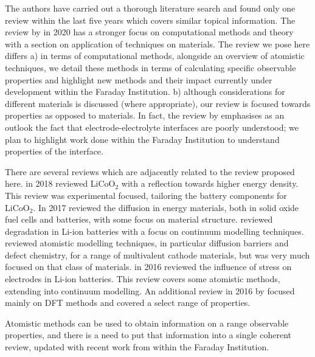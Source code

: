 \documentclass{article}
\begin{document}
The authors have carried out a thorough literature search and found only one review within the last five years which covers similar topical information. The review by \textcite{van_der_ven_rechargeable_2020} in 2020 has a stronger focus on computational methods and theory with a section on application of techniques on materials. The review we pose here differs a) in terms of computational methods, alongside an overview of atomistic techniques, we detail these methods in terms of calculating specific observable properties and highlight new methods and their impact currently under development within the Faraday Institution. b) although considerations for different materials is discussed (where appropriate), our review is focused towards properties as opposed to materials. In fact, the review by \textcite{van_der_ven_rechargeable_2020} emphasises as an outlook the fact that electrode-electrolyte interfaces are poorly understood; we plan to highlight work done within the Faraday Institution to understand properties of the interface.

There are several reviews which are adjacently related to the review proposed here. \textcite{wang_reviving_2018} in 2018 reviewed LiCoO$_2$ with a reflection towards higher energy density. This review was experimental focused, tailoring the battery components for LiCoO$_2$. In 2017 \textcite{parfitt_diffusion_2017} reviewed the diffusion in energy materials, both in solid oxide fuel cells and batteries, with some focus on material structure. \textcite{zhang_chemomechanical_2017} reviewed degradation in Li-ion batteries with a focus on continuum modelling techniques. \textcite{canepa_computational_2017} reviewed atomistic modelling techniques, in particular diffusion barriers and defect chemistry, for a range of multivalent cathode materials, but was very much focused on that class of materials. \textcite{xu_electrochemomechanics_2016} in 2016 reviewed the influence of stress on electrodes in Li-ion batteries. This review covers some atomistic methods, extending into continuum modelling. An additional review in 2016 by \textcite{urban_computational_2016} focused mainly on DFT methods and covered a select range of properties.

Atomistic methods can be used to obtain information on a range observable properties, and there is a need to put that information into a single coherent review, updated with recent work from within the Faraday Institution.

%
\printbibliography[heading=none]
\end{document}
